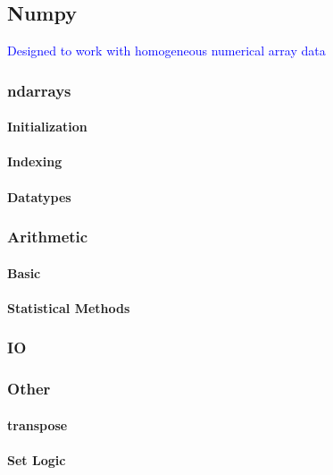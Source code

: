 \subsection{Numpy}

\textcolor{blue}{Designed to work with homogeneous numerical array data}

\subsubsection{ndarrays}

\paragraph{Initialization}

\paragraph{Indexing}

\paragraph{Datatypes}

\subsubsection{Arithmetic}

\paragraph{Basic}

\paragraph{Statistical Methods}

\subsubsection{IO}



\subsubsection{Other}

\paragraph{transpose}

\paragraph{Set Logic}



